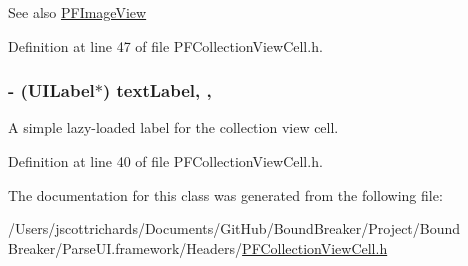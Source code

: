 \begin{DoxySeeAlso}{See also}
\hyperlink{interface_p_f_image_view}{P\+F\+Image\+View} 
\end{DoxySeeAlso}


Definition at line 47 of file P\+F\+Collection\+View\+Cell.\+h.

\hypertarget{interface_p_f_collection_view_cell_a7b74bb02a74dc52ce87a7b6b45d9feaf}{}
\subsubsection[{text\+Label}]{\setlength{\rightskip}{0pt plus 5cm}-\/ (U\+I\+Label$\ast$) text\+Label\hspace{0.3cm}{\ttfamily [read]}, {\ttfamily [nonatomic]}, {\ttfamily [strong]}}\label{interface_p_f_collection_view_cell_a7b74bb02a74dc52ce87a7b6b45d9feaf}
A simple lazy-\/loaded label for the collection view cell. 

Definition at line 40 of file P\+F\+Collection\+View\+Cell.\+h.



The documentation for this class was generated from the following file\+:\begin{DoxyCompactItemize}
\item 
/\+Users/jscottrichards/\+Documents/\+Git\+Hub/\+Bound\+Breaker/\+Project/\+Bound Breaker/\+Parse\+U\+I.\+framework/\+Headers/\hyperlink{_p_f_collection_view_cell_8h}{P\+F\+Collection\+View\+Cell.\+h}\end{DoxyCompactItemize}
